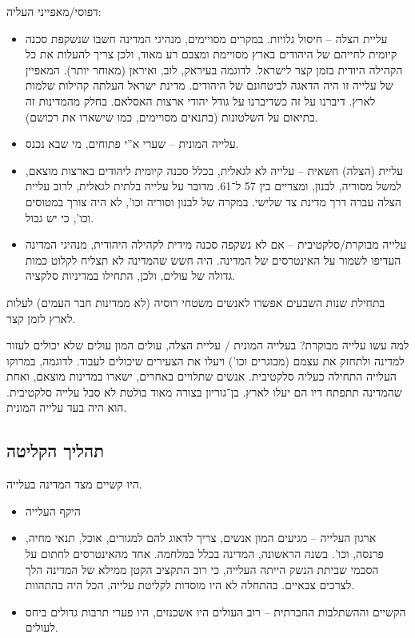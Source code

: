 \documentclass[]{../../../../tex/classes/styledArticle}
\begin{document}
	דפוסי/מאפייני העליה: 
	\begin{itemize}
		\item עליית הצלה – חיסול גלויות. במקרים מסויימים, מנהיגי המדינה חשבו שנשקפת סכנה קיומית לחייהם של היהודים בארץ מסויימת ומצבם רע מאוד, ולכן צריך להעלות את כל הקהילה היודית בזמן קצר לישראל. לדוגמה בעיראק, לוב, ואיראן (מאוחר יותר). המאפיין של עלייה זו היה הדאגה לביטחונם של היהודים. מדינת ישראל העלתה קהילות שלמות לארץ. דיברנו על זה כשדיברנו על גודל יהודי ארצות האסלאם. בחלק מהמדינות זה בתיאום על השלטונות (בתנאים מסויימים, כמו שישארו את רכושם). 
		\item עלייה המונית – שערי א''י פתוחים, מי שבא נכנס. 
		\item עליית (הצלה) חשאית – עלייה לא לגאלית, בכלל סכנה קיומית ליהודים בארצות מוצאם, למשל מסוריה, לבנון, ומצריים בין 57 ל־61. מדובר על עלייה בלתית לגאלית, לרוב עליית הצלה עברה דרך מדינת צד שלישי. במקרה של לבנון וסוריה וכו', לא היה צורך במטוסים וכו', כי יש גבול. 
		\item עלייה מבוקרת/סלקטיבית – אם לא נשקפה סכנה מידית לקהילה היהודית, מנהיגי המדינה העדיפו לשמור על האינטרסים של המדינה. היה חשש שהמדינה לא תצליח לקלוט כמות גדולה של עולים, ולכן, התחילו במדיניות סלקציה. 
	\end{itemize}
	
	בתחילת שנות השבעים אפשרו לאנשים משטחי רוסיה (לא ממדינות חבר העמים) לעלות לארץ לזמן קצר. 
	
	למה עשו עלייה מבוקרת? בעלייה המונית / עליית הצלה, עולים המון עולים שלא יכולים לעזור למדינה ולתחזק את עצמם (מבוגרים וכו') ויעלו את הצעירים שיכולים לעבוד. לדוגמה, במרוקו העלייה התחילה כעליה סלקטיבית. אנשים שתלויים באחרים, ישארו במדינות מוצאם, ואחת שהמדינה תתפתח דיו הם יעלו לארץ. בן־גוריון בצורה מאוד בולטת לא סבל עלייה סלקטיבית. הוא היה בעד עלייה המונית. 
	
	\subsection*{תהליך הקליטה}
	היו קשיים מצד המדינה בעלייה. 
	\begin{itemize}
		\item היקף העלייה
		\item ארגון העלייה – מגיעים המון אנשים, צריך לדאוג להם למגורים, אוכל, תנאי מחיה, פרנסה, וכו'. בשנה הראשונה, המדינה בכלל במלחמה. אחד מהאינטרסים לחתום על הסכמי שביתת הנשק הייתה העלייה, כי רוב התקציב הקטן ממילא של המדינה הלך לצרכים צבאיים. בהתחלה לא היו מוסדות לקליטת עלייה, הכל היה בהתהוות. 
		\item הקשיים וההשתלבות החברתית – רוב העולים היו אשכנזים, היו פערי תרבות גדולים ביחס לעולים. 
	\end{itemize}
	
\end{document}
